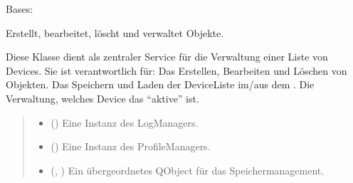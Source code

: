 \documentclass[letterpaper,10pt,english]{sphinxmanual}
\begin{document}

\begin{fulllineitems}
\label{\detokenize{modulab/device_manager:modules.device.DeviceManager.DeviceManager}}
\pysigstartsignatures
\pysiglinewithargsret
{}
{\sphinxparamcomma {}\sphinxparamcomma {}}
{}
\pysigstopsignatures
\sphinxAtStartPar
Bases: 

\sphinxAtStartPar
Erstellt, bearbeitet, löscht und verwaltet \sphinxhyphen{}Objekte.

\sphinxAtStartPar
Diese Klasse dient als zentraler Service für die Verwaltung einer
Liste von Devices. Sie ist verantwortlich für:
\sphinxhyphen{} Das Erstellen, Bearbeiten und Löschen von \sphinxhyphen{}Objekten.
\sphinxhyphen{} Das Speichern und Laden der Device\sphinxhyphen{}Liste im/aus dem .
\sphinxhyphen{} Die Verwaltung, welches Device das “aktive” ist.
\begin{quote}\begin{description}
\begin{itemize}
\item {} 
\sphinxAtStartPar
{} () \textendash{} Eine Instanz des LogManagers.

\item {} 
\sphinxAtStartPar
{} () \textendash{} Eine Instanz des ProfileManagers.

\item {} 
\sphinxAtStartPar
{} (, ) \textendash{} Ein übergeordnetes QObject für das Speichermanagement.

\end{itemize}


\end{description}
\end{quote}
\end{fulllineitems}
\end{document}
